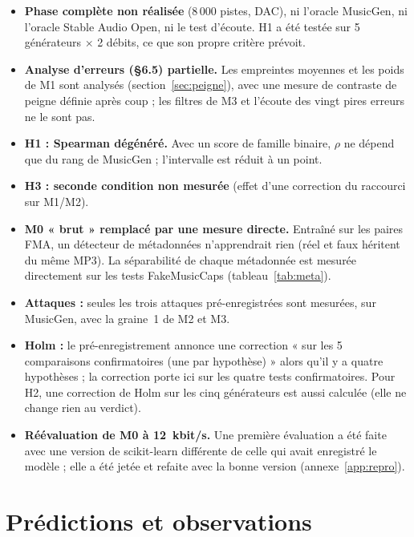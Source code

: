 \documentclass[a4paper, 11pt]{article}
\begin{document}
\begin{itemize}
    \item \textbf{Phase complète non réalisée} (8\,000 pistes, DAC), ni l'oracle MusicGen, ni l'oracle
    Stable Audio Open, ni le test d'écoute. H1 a été testée sur 5 générateurs $\times$ 2 débits, ce que son
    propre critère prévoit.
    \item \textbf{Analyse d'erreurs (§6.5) partielle.} Les empreintes moyennes et les poids de M1 sont
    analysés (section~\ref{sec:peigne}), avec une mesure de contraste de peigne définie après coup ; les
    filtres de M3 et l'écoute des vingt pires erreurs ne le sont pas.
    \item \textbf{H1 : Spearman dégénéré.} Avec un score de famille binaire, $\rho$ ne dépend que du rang de
    MusicGen ; l'intervalle est réduit à un point.
    \item \textbf{H3 : seconde condition non mesurée} (effet d'une correction du raccourci sur M1/M2).
    \item \textbf{M0 « brut » remplacé par une mesure directe.} Entraîné sur les paires FMA, un détecteur de
    métadonnées n'apprendrait rien (réel et faux héritent du même MP3). La séparabilité de chaque
    métadonnée est mesurée directement sur les tests FakeMusicCaps (tableau~\ref{tab:meta}).
    \item \textbf{Attaques :} seules les trois attaques pré-enregistrées sont mesurées, sur MusicGen, avec
    la graine~1 de M2 et M3.
    \item \textbf{Holm :} le pré-enregistrement annonce une correction « sur les 5 comparaisons
    confirmatoires (une par hypothèse) » alors qu'il y a quatre hypothèses ; la correction porte ici sur
    les quatre tests confirmatoires. Pour H2, une correction de Holm sur les cinq générateurs est
    aussi calculée (elle ne change rien au verdict).
    \item \textbf{Réévaluation de M0 à 12~kbit/s.} Une première évaluation a été faite avec une version
    de scikit-learn différente de celle qui avait enregistré le modèle ; elle a été jetée et refaite avec
    la bonne version (annexe~\ref{app:repro}).
\end{itemize}

\section{Prédictions et observations}
\label{app:predictions}
\end{document}
